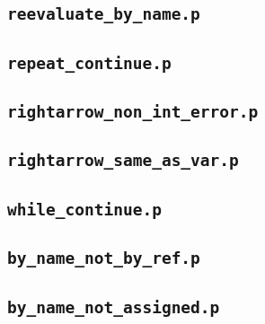 \subsection{\textbf{\texttt{reevaluate\_by\_name.p}}}


\subsection{\textbf{\texttt{repeat\_continue.p}}}


\subsection{\textbf{\texttt{rightarrow\_non\_int\_error.p}}}


\subsection{\textbf{\texttt{rightarrow\_same\_as\_var.p}}}


\subsection{\textbf{\texttt{while\_continue.p}}}


\subsection{\textbf{\texttt{by\_name\_not\_by\_ref.p}}}


\subsection{\textbf{\texttt{by\_name\_not\_assigned.p}}}

